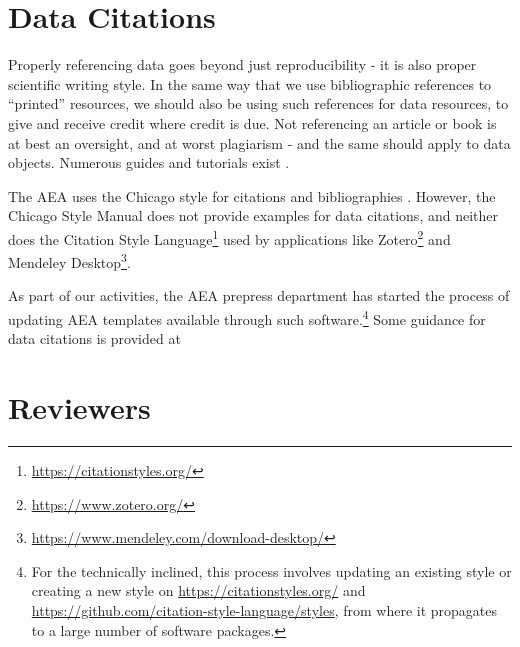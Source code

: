 \documentclass[AEJ]{AEA}
\begin{document}
\section{Data Citations}
Properly referencing data goes beyond just reproducibility - it is also proper scientific writing style. In the same way that we use bibliographic references to ``printed'' resources, we should also be using such references for data resources, to give and receive credit where credit is due. Not referencing an article or book is at best an oversight, and at worst plagiarism - and the same should apply to data objects. Numerous guides and tutorials exist  \citep{dataone-l09,icpsr-data-cite,force11declaration}.

The AEA uses the Chicago style for citations and bibliographies \citep{aeadatarefs}. However, the Chicago Style Manual \citep{citation-machine,ChicagoManualofStyleChicagoManualStyle2018} does not provide examples for data citations, and neither does the Citation Style Language\footnote{\url{https://citationstyles.org/}} used by applications like Zotero\footnote{\url{https://www.zotero.org/}} and Mendeley Desktop\footnote{\url{https://www.mendeley.com/download-desktop/}}.


As part of our activities, the AEA prepress department has started the process of updating AEA templates available through such software.\footnote{For the technically inclined, this process involves updating an existing style or creating a new style on \url{https://citationstyles.org/} and \url{https://github.com/citation-style-language/styles}, from where it propagates to a large number of software packages.} Some guidance for data citations is provided at 





\appendix

\section{Reviewers}
\end{document}
